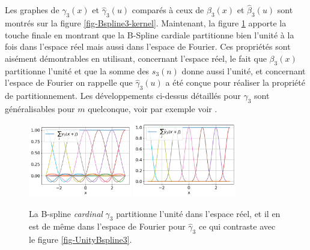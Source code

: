 \documentclass[11pt,twoside]{article}
\begin{document}
Les graphes de $\gamma_3(x)$ et $\hat{\gamma}_3(u)$ comparés à ceux de $\beta_3(x)$ et $\hat{\beta}_3(u)$ sont montrés sur la figure \ref{fig-Bspline3-kernel}. Maintenant, la figure \ref{fig-UnityBsplineCard3} apporte la touche finale en montrant que la B-Spline cardiale partitionne bien l'unité à la fois dans l'espace réel mais aussi dans l'espace de Fourier. Ces propriétés sont aisément démontrables en utilisant, concernant l'espace réel, le fait que $\beta_3(x)$ partitionne l'unité  et que la somme des $s_3(n)$ donne aussi l'unité, et concernant l'espace de Fourier on rappelle que $\hat{\gamma}_3(u)$ a été conçue pour réaliser la propriété de partitionnement. Les développements ci-dessus détaillés pour $\gamma_3$ sont généralisables pour $m$ quelconque, voir par exemple voir \cite{Unser1993a}.
\begin{figure}
\centering
\includegraphics[width=0.4\textwidth]{fig9a.png}
\includegraphics[width=0.4\textwidth]{fig9b.png}
\caption{La B-spline \textit{cardinal} $\gamma_3$ partitionne l'unité dans l'espace réel, et il en est de même dans l'espace de Fourier pour $\hat{\gamma}_3$ ce qui contraste avec le figure \ref{fig-UnityBspline3}.}
\label{fig-UnityBsplineCard3}
\end{figure}
\end{document}
